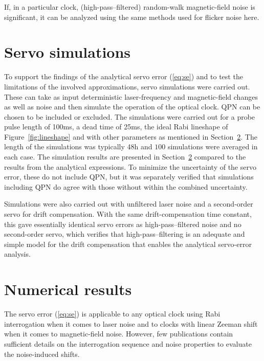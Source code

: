 \documentclass[10pt,a4paper]{iopart}
\newcommand{\eqref}[1]{(\ref{#1})}
\begin{document}
If, in a particular clock, (high-pass--filtered) random-walk magnetic-field noise is significant, it can be analyzed using the same methods used for flicker noise here.


\section{Servo simulations} \label{sec:sim}

To support the findings of the analytical servo error \eqref{eq:se} and to test the limitations of the involved approximations, servo simulations were carried out. These can take as input deterministic laser-frequency and magnetic-field changes as well as noise and then simulate the operation of the optical clock. QPN can be chosen to be included or excluded. The simulations were carried out for a probe pulse length of 100\;ms, a dead time of 25\;ms, the ideal Rabi lineshape of Figure~\ref{fig:lineshape} and with other parameters as mentioned in Section~\ref{sec:results}. The length of the simulations was typically 48\;h and $100$ simulations were averaged in each case.
The simulation results are presented in Section~\ref{sec:results} compared to the results from the analytical expressions.
To minimize the uncertainty of the servo error, these do not include QPN, but it was separately verified that simulations including QPN do agree with those without within the combined uncertainty.

Simulations were also carried out with unfiltered laser noise and a second-order servo for drift compensation. With the same drift-compensation time constant, this gave essentially identical servo errors as high-pass--filtered noise and no second-order servo, which verifies that high-pass--filtering is an adequate and simple model for the drift compensation that enables the analytical servo-error analysis.


\section{Numerical results} \label{sec:results}

The servo error \eqref{eq:se} is applicable to any optical clock using Rabi interrogation when it comes to laser noise and to clocks with linear Zeeman shift when it comes to magnetic-field noise. However, few publications contain sufficient details on the interrogation sequence and noise properties to evaluate the noise-induced shifts.
\end{document}
